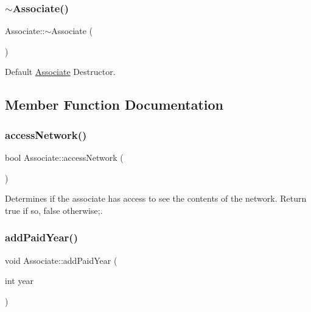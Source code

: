 \subsubsection{\texorpdfstring{$\sim$\+Associate()}{~Associate()}}
{\footnotesize\ttfamily Associate\+::$\sim$\+Associate (\begin{DoxyParamCaption}{ }\end{DoxyParamCaption})\hspace{0.3cm}{\ttfamily [virtual]}}



Default \mbox{\hyperlink{classAssociate}{Associate}} Destructor. 



\subsection{Member Function Documentation}
\mbox{\label{classAssociate_a147bd9c2b6148974d8c36f7a8f5b632a}} 
\subsubsection{\texorpdfstring{access\+Network()}{accessNetwork()}}
{\footnotesize\ttfamily bool Associate\+::access\+Network (\begin{DoxyParamCaption}{ }\end{DoxyParamCaption})}



Determines if the associate has access to see the contents of the network. Return true if so, false otherwise;. 

\mbox{\label{classAssociate_a12bec7095075fd58fafb5ebf2a24e924}} 
\subsubsection{\texorpdfstring{add\+Paid\+Year()}{addPaidYear()}}
{\footnotesize\ttfamily void Associate\+::add\+Paid\+Year (\begin{DoxyParamCaption}\item[{int}]{year }\end{DoxyParamCaption})}



